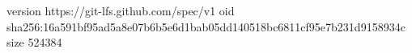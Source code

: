 version https://git-lfs.github.com/spec/v1
oid sha256:16a591bf95ad5a8e07b6b5e6d1bab05dd140518bc6811cf95e7b231d9158934c
size 524384
